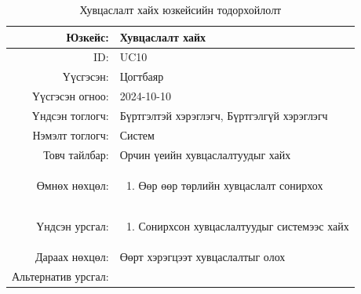 \begin{longtable}{|r|p{11.5cm}|}
    \caption{Хувцаслалт хайх юзкейсийн тодорхойлолт} 
    \label{table:songolt3}\\ \hline
    {Юзкейс:} & {Хувцаслалт хайх}\\ \hline
    {ID:} & {UC10}\\ \hline
    {Үүсгэсэн:} & {Цогтбаяр}\\ \hline
    {Үүсгэсэн огноо:} & {2024-10-10}\\ \hline
    {Үндсэн тоглогч:} & {Бүртгэлтэй хэрэглэгч, Бүртгэлгүй хэрэглэгч}\\ \hline
    {Нэмэлт тоглогч:} & {Систем}\\ \hline
    {Товч тайлбар:} & {Орчин үеийн хувцаслалтуудыг хайх }\\ \hline
    {Өмнөх нөхцөл:} & {\begin{enumerate}
        \item Өөр өөр төрлийн хувцаслалт сонирхох
    \end{enumerate}}\\ \hline
    {Үндсэн урсгал:} & {\begin{enumerate}
        \item Сонирхсон хувцаслалтуудыг системээс хайх 
        \end{enumerate}}\\ \hline
    {Дараах нөхцөл:} & { Өөрт хэрэгцээт хувцаслалтыг олох }\\ \hline
    {Альтернатив урсгал:} & {\begin{enumerate}
    \end{enumerate}}\\ \hline
\end{longtable}
\newpage
